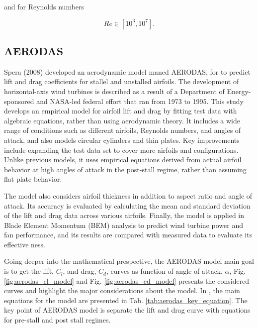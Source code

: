 and for Reynolds numbers

\begin{equation}
    Re \in [10^3, 10^7].
\end{equation}

\subsection{AERODAS}
\label{sec:aerodas}

Spera (2008) \cite{spera_models_2008} developed an aerodynamic model  maned AERODAS, for to predict lift and drag coefficients for stallel and unstalled airfoils. The development of horizontal-axis wind turbines is described as a result of a Department of Energy-sponsored and NASA-led federal effort that ran from 1973 to 1995. This study develops an empirical model for airfoil lift and drag by fitting test data with algebraic equations, rather than using aerodynamic theory. It includes a wide range of conditions such as different airfoils, Reynolds numbers, and angles of attack, and also models circular cylinders and thin plates. Key improvements include expanding the test data set to cover more airfoils and configurations. Unlike previous models, it uses empirical equations derived from actual airfoil behavior at high angles of attack in the post-stall regime, rather than assuming flat plate behavior.

The model also considers airfoil thickness in addition to aspect ratio and angle of attack. Its accuracy is evaluated by calculating the mean and standard deviation of the lift and drag data across various airfoils. Finally, the model is applied in Blade Element Momentum (BEM) analysis to predict wind turbine power and fan performance, and its results are compared with measured data to evaluate its effective
ness.

Going deeper into the mathematical prespective, the AERODAS model main goal is to get the lift, $C_l$, and drag, $C_d$, curves as function of angle of attack, $\alpha$, Fig. \ref{fig:aerodas_cl_model} and Fig. \ref{fig:aerodas_cd_model} presents the considered curves and highlight the major considerations about the model. In \cite{spera_models_2008}, the main equations for the model are presented in Tab. \ref{tab:aerodas_key_equation}. The key point of AERODAS model is separate the lift and drag curve with equations for pre-stall and post stall regimes.


